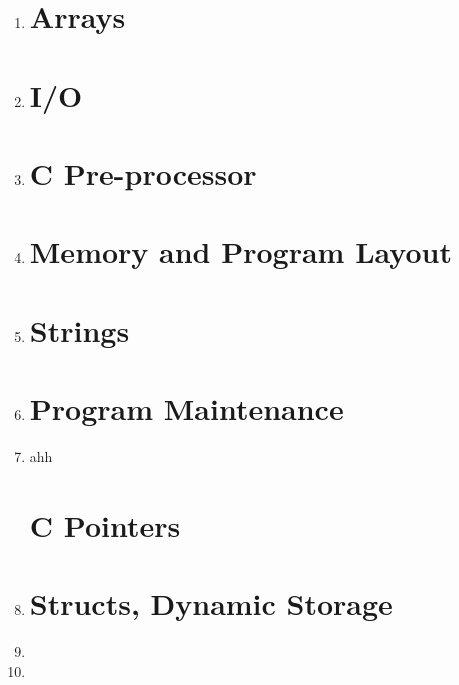 \documentclass[11pt]{article}
\begin{document}
\begin{enumerate}
	\item 

\section*{Arrays}
	
	\item 

\section*{I/O}

	\item 

\section*{C Pre-processor}

	\item 

\section*{Memory and Program Layout}

	\item 

\section*{Strings}

	\item 

\section*{Program Maintenance}

	\item ahh

\section*{C Pointers}

	\item 

\pagebreak
\section*{Structs, Dynamic Storage}

	\item 
	\item 

\end{enumerate}
\end{document}
